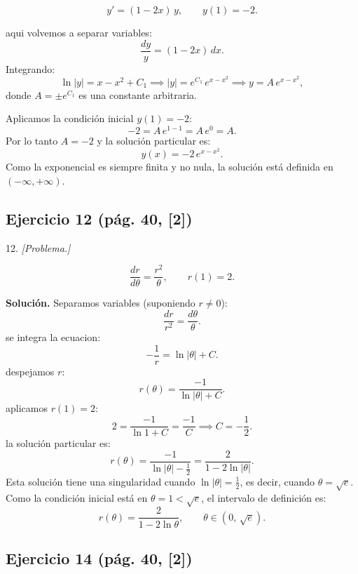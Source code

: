 \begin{respuesta}

\[
  y' = (1-2x)\,y, \qquad y(1) = -2.
\]

aqui volvemos a separar variables:
\[
  \frac{dy}{y} = (1-2x)\,dx.
\]
Integrando:
\[
  \ln|y| = x - x^2 + C_1
  \implies
  |y| = e^{C_1}\,e^{x-x^2}
  \implies
  y = A\,e^{x-x^2},
\]
donde $A = \pm e^{C_1}$ es una constante arbitraria.

Aplicamos la condici\'on inicial $y(1) = -2$:
\[
  -2 = A\,e^{1-1} = A\,e^{0} = A.
\]
Por lo tanto $A = -2$ y la soluci\'on particular es:
\[
  \boxed{y(x) = -2\,e^{x - x^2}.}
\]
Como la exponencial es siempre finita y no nula, la soluci\'on est\'a definida en
$(-\infty, +\infty)$.
    \vspace{7cm}
\end{respuesta}

\subsection*{Ejercicio 12 \quad\normalfont\small(pág. 40, [2])}

\begin{enunciado}{12.}
    \textit{[Problema.]}
\end{enunciado}

\begin{respuesta}
\[
  \frac{dr}{d\theta} = \frac{r^2}{\theta}, \qquad r(1) = 2.
\]

\textbf{Soluci\'on.} Separamos variables (suponiendo $r \neq 0$):
\[
  \frac{dr}{r^2} = \frac{d\theta}{\theta}.
\]
se integra la ecuacion:
\[
  -\frac{1}{r} = \ln|\theta| + C.
\]
despejamos $r$:
\[
  r(\theta) = \frac{-1}{\ln|\theta| + C}.
\]
aplicamos $r(1) = 2$:
\[
  2 = \frac{-1}{\ln 1 + C} = \frac{-1}{C}
  \implies C = -\frac{1}{2}.
\]
la soluci\'on particular es:
\[
  r(\theta) = \frac{-1}{\ln|\theta| - \tfrac{1}{2}}
  = \frac{2}{1 - 2\ln|\theta|}.
\]
Esta soluci\'on tiene una singularidad cuando $\ln|\theta| = \tfrac{1}{2}$, es decir,
cuando $\theta = \sqrt{e}$. Como la condici\'on inicial est\'a en $\theta = 1 < \sqrt{e}$,
el intervalo de definici\'on es:
\[
  r(\theta) = \frac{2}{1 - 2\ln\theta}, \qquad \theta \in \left(0,\, \sqrt{e}\right).
\]
    \vspace{7cm}
\end{respuesta}

\subsection*{Ejercicio 14 \quad\normalfont\small(pág. 40, [2])}

